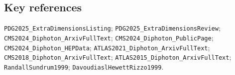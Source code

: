 \subsection*{Key references}
\texttt{PDG2025\_ExtraDimensionsListing};
\texttt{PDG2025\_ExtraDimensionsReview};
\texttt{CMS2024\_Diphoton\_ArxivFullText};
\texttt{CMS2024\_Diphoton\_PublicPage};
\texttt{CMS2024\_Diphoton\_HEPData};
\texttt{ATLAS2021\_Diphoton\_ArxivFullText};
\texttt{CMS2018\_Diphoton\_ArxivFullText};
\texttt{ATLAS2015\_Diphoton\_ArxivFullText};
\texttt{RandallSundrum1999};
\texttt{DavoudiaslHewettRizzo1999}.
